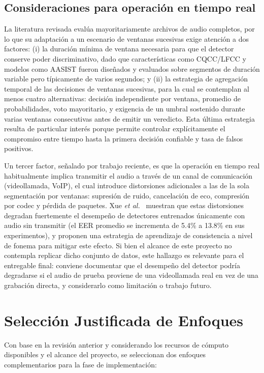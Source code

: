\documentclass[conference]{IEEEtran}
\begin{document}
\subsection{Consideraciones para operación en tiempo real}

La literatura revisada evalúa mayoritariamente archivos de audio completos, por lo que su adaptación a un escenario de ventanas sucesivas exige atención a dos factores: (i) la duración mínima de ventana necesaria para que el detector conserve poder discriminativo, dado que características como CQCC/LFCC y modelos como AASIST fueron diseñados y evaluados sobre segmentos de duración variable pero típicamente de varios segundos; y (ii) la estrategia de agregación temporal de las decisiones de ventanas sucesivas, para la cual se contemplan al menos cuatro alternativas: decisión independiente por ventana, promedio de probabilidades, voto mayoritario, y exigencia de un umbral sostenido durante varias ventanas consecutivas antes de emitir un veredicto. Esta última estrategia resulta de particular interés porque permite controlar explícitamente el compromiso entre tiempo hasta la primera decisión confiable y tasa de falsos positivos.

Un tercer factor, señalado por trabajo reciente, es que la operación en tiempo real habitualmente implica transmitir el audio a través de un canal de comunicación (videollamada, VoIP), el cual introduce distorsiones adicionales a las de la sola segmentación por ventanas: supresión de ruido, cancelación de eco, compresión por codec y pérdida de paquetes. Xue \emph{et al.}~\cite{xue2026rtcfake} muestran que estas distorsiones degradan fuertemente el desempeño de detectores entrenados únicamente con audio sin transmitir (el EER promedio se incrementa de 5.4\% a 13.8\% en sus experimentos), y proponen una estrategia de aprendizaje de consistencia a nivel de fonema para mitigar este efecto. Si bien el alcance de este proyecto no contempla replicar dicho conjunto de datos, este hallazgo es relevante para el entregable final: conviene documentar que el desempeño del detector podría degradarse si el audio de prueba proviene de una videollamada real en vez de una grabación directa, y considerarlo como limitación o trabajo futuro.

\section{Selección Justificada de Enfoques}

Con base en la revisión anterior y considerando los recursos de cómputo disponibles y el alcance del proyecto, se seleccionan dos enfoques complementarios para la fase de implementación:
\end{document}
